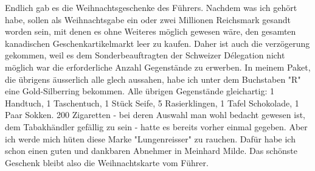 \def\day{7. Februar 1943}
\mktitle

Endlich gab es die Weihnachtsgeschenke des F\"{u}hrers.
Nachdem was ich geh\"{o}rt habe, sollen als Weihnachtsgabe ein oder zwei Millionen Reichsmark gesandt worden sein, mit denen es ohne Weiteres m\"{o}glich gewesen w\"{a}re, den gesamten kanadischen Geschenkartikelmarkt leer zu kaufen.
Daher ist auch die verz\"{o}gerung gekommen, weil es dem Sonderbeauftragten der Schweizer Délegation nicht m\"{o}glich war die erforderliche Anzahl Gegenst\"{a}nde zu erwerben.
In meinem Paket, die \"{u}brigens \"{a}usserlich alle glech aussahen, habe ich unter dem Buchstaben "R" eine Gold-Silberring bekommen.
Alle \"{u}brigen Gegenst\"{a}nde gleichartig: 1 Handtuch, 1 Taschentuch, 1 St\"{u}ck Seife, 5 Rasierklingen, 1 Tafel Schokolade, 1 Paar Sokken.
200 Zigaretten - bei deren Auswahl man wohl bedacht gewesen ist, dem Tabakh\"{a}ndler gef\"{a}llig zu sein - hatte es bereits vorher einmal gegeben.
Aber ich werde mich h\"{u}ten diese Marke "Lungenreisser" zu rauchen.
Daf\"{u}r habe ich schon einen guten und dankbaren Abnehmer in Meinhard Milde.
Das sch\"{o}nste Geschenk bleibt also die Weihnachtskarte vom F\"{u}hrer.

\clearpage
